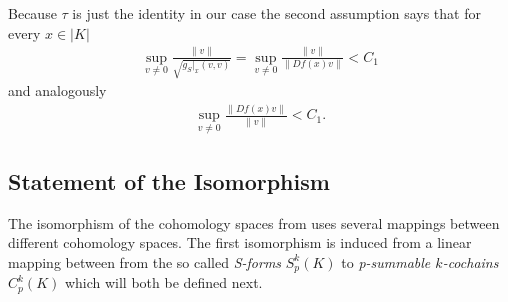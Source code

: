 \documentclass[12pt,a4paper]{article}
\theoremstyle{definition}
\newcommand{\real}{\mathbb{R}}
\begin{document}
Because $\tau$ is just the identity in our case 
the second assumption says that for every 
$x \in |K|$
\begin{align*}
\sup\limits_{v \neq 0} \frac{\lVert v \rVert}{\sqrt{g_S|_x(v,v)}} =
\sup\limits_{v \neq 0} \frac{\lVert v \rVert}{\lVert Df(x)v\rVert} < C_1
\end{align*}
and analogously
\begin{align*}
    \sup\limits_{v \neq 0} \frac{\lVert Df(x)v\rVert}{\lVert v \rVert} < C_1.
\end{align*}



\subsection{Statement of the Isomorphism}

The isomorphism of the cohomology spaces from \cite{goldshtein} uses several
mappings between different cohomology spaces. 
The first isomorphism is induced from a linear mapping
between from the so called \textit{S-forms} 
$S_p^k(K)$ to \textit{p-summable $k$-cochains} $C_p^k(K)$ which will both 
be defined next.
\end{document}
